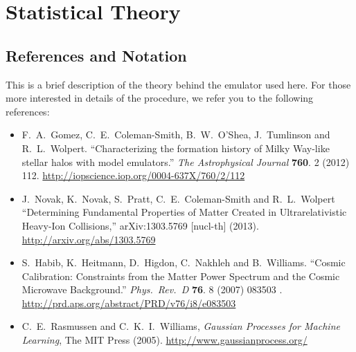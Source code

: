\section{Statistical Theory}
\subsection{References and Notation}

This is a brief description of the theory behind the emulator used here. For those more interested in details of the procedure, we refer you to the following references:
\begin{itemize}

\item F.~A.~Gomez, C.~E.~Coleman-Smith, B.~W.~O'Shea, J.~Tumlinson and R.~L.~Wolpert.
  ``Characterizing the formation history of Milky Way-like stellar halos with model emulators.''
	\emph{The Astrophysical Journal} {\bf 760}. 2 (2012) 112.
\url{http://iopscience.iop.org/0004-637X/760/2/112}

\item J.~Novak, K.~Novak, S.~Pratt, C.~E.~Coleman-Smith and R.~L.~Wolpert
  ``Determining Fundamental Properties of Matter Created in Ultrarelativistic Heavy-Ion Collisions,''
  arXiv:1303.5769 [nucl-th] (2013).
\url{http://arxiv.org/abs/1303.5769}

\item S.~Habib, K.~Heitmann, D.~Higdon, C.~Nakhleh and B.~Williams.
  ``Cosmic Calibration: Constraints from the Matter Power Spectrum and the Cosmic Microwave Background.''
  \emph{Phys.\ Rev.\ D} {\bf 76}. 8 (2007) 083503 .
\url{http://prd.aps.org/abstract/PRD/v76/i8/e083503}

\item C.~E.~Rasmussen and C.~K.~I.~Williams, \emph{Gaussian Processes for Machine Learning}, The MIT Press (2005).
\url{http://www.gaussianprocess.org/}

\end{itemize}
